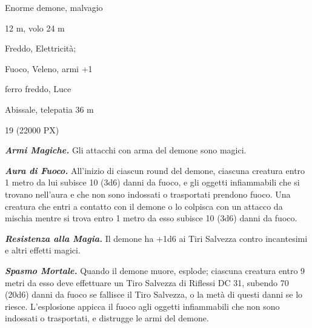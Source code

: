 \begin{multicols}{2}
{
\begin{description}[noitemsep, topsep=0pt, parsep=0pt, partopsep=0pt, itemsep=1pt, leftmargin=2.35cm,  labelwidth=2.2cm, itemindent=0cm, listparindent=0pt] %
\setlength{\baselineskip}{10pt}
\item[\textbf{Taglia/Tipo}] Enorme demone, malvagio
\item[\textbf{Caratt.}] 
\item[\textbf{Punti Ferita}] 
\item[\textbf{Movimento}] 12 m, volo 24 m
\item[\textbf{Tiri Salvez.}] 
\item[\textbf{Res. Danni}] Freddo, Elettricità;
\item[\textbf{Imm. Danni}] Fuoco, Veleno, armi +1
\item[\textbf{Vulnerabilità}] ferro freddo, Luce
\item[\textbf{Sensi}] 
\item[\textbf{Linguaggi}] Abissale, telepatia 36 m
\item[\textbf{Sfida}] 19 (22000 PX)
\end{description}
\smallskip

\emph{\textbf{Armi Magiche.}} Gli attacchi con arma del demone sono magici.

\emph{\textbf{Aura di Fuoco.}} All'inizio di ciascun round del demone, ciascuna creatura entro 1 metro da lui subisce 10 (3d6) danni da fuoco, e gli oggetti infiammabili che si trovano nell'aura e che non sono indossati o trasportati prendono fuoco. Una creatura che entri a contatto con il demone o lo colpisca con un attacco da mischia mentre si trova entro 1 metro da esso subisce 10 (3d6) danni da fuoco.

\emph{\textbf{Resistenza alla Magia.}} Il demone ha +1d6 ai Tiri Salvezza contro incantesimi e altri effetti magici.

\emph{\textbf{Spasmo Mortale.}} Quando il demone muore, esplode; ciascuna creatura entro 9 metri da esso deve effettuare un Tiro Salvezza di Riflessi DC 31, subendo 70 (20d6) danni da fuoco se fallisce il Tiro Salvezza, o la metà di questi danni se lo riesce. L'esplosione appicca il fuoco agli oggetti infiammabili che non sono indossati o trasportati, e distrugge le armi del demone.

}
\end{multicols}
